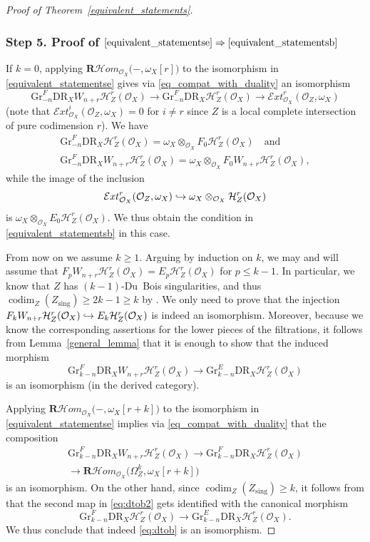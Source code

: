 \documentclass[JEP,XML,SOM,Unicode]{cedram}
\newcommand\hto{\mathrel{\lhook\joinrel\to}}
\theoremstyle{plain}
\theoremstyle{definition}
\newcommand\R{{\mathbf R}}
\newcommand\cH{\mathcal{H}}
\newcommand\cO{\mathcal{O}}
\newcommand\cH{\mathcal{H}}
\newcommand\cO{\mathcal{O}}
\newcommand\gr{\mathrm{Gr}}
\newcommand\DR{\mathrm{DR}}
\newcommand\sing{\mathrm{sing}}
\DeclareMathOperator{\codim}{codim}
\begin{document}
\begin{proof}[Proof of Theorem~\ref{equivalent_statements}]
\subsubsection*{Step 5. Proof of $\eqref{equivalent_statementse}\Rightarrow\eqref{equivalent_statementsb}$}
If $k=0$, applying $\R\cH om_{\cO_X}\big(-,\omega_X[r]\big)$ to the isomorphism in \eqref{equivalent_statementse} gives via \eqref{eq_compat_with_duality} an isomorphism\vspace*{-3pt}
\[\gr^F_{-n}\DR_XW_{n+r}\cH^r_Z(\cO_X)\to \gr^F_{-n}\DR_X\cH^r_Z(\cO_X)\to {\mathcal Ext}^r_{\cO_X}(\cO_Z,\omega_X)\]
(note that ${\mathcal Ext}^i_{\cO_X}(\cO_Z,\omega_X)=0$ for $i\neq r$ since $Z$ is a local complete intersection of pure codimension $r$).
We have
\begin{gather*}
\gr^F_{-n}\DR_X\cH^r_Z(\cO_X)=\omega_X\otimes_{\cO_X}F_0\cH^r_Z(\cO_X)\quad\text{and}\\
\gr^F_{-n}\DR_XW_{n+r}\cH^r_Z(\cO_X)=\omega_X\otimes_{\cO_X}F_0W_{n+r}\cH^r_Z(\cO_X),
\end{gather*}
while the image of the inclusion
\[
{\mathcal Ext}^r_{\cO_X}(\cO_Z,\omega_X)\hto \omega_X\otimes_{\cO_X}\cH^r_Z(\cO_X)
\]
is
$\omega_X\otimes_{\cO_X}E_0\cH^r_Z(\cO_X)$. We thus obtain the condition in \eqref{equivalent_statementsb} in this case.

From now on we assume $k\geq 1$. Arguing by induction on $k$, we may and will assume that
$F_pW_{n+r}\cH^r_Z(\cO_X)=E_p\cH^r_Z(\cO_X)$ for $p\leq k-1$. In particular, we know that $Z$ has $(k-1)$-Du~Bois singularities, and thus
$\codim_Z(Z_\sing)\geq 2k-1\geq k$ by \cite[Cor.\,3.40]{MP1}.
We only need to prove that the injection $F_{k}W_{n+r}\cH^r_Z(\cO_X) \hto E_{k}\cH^r_Z(\cO_X)$ is indeed an isomorphism.
Moreover, because we know the corresponding assertions for the lower pieces of the filtrations, it follows from Lemma~\ref{general_lemma}
that it is enough to show that the induced morphism
\begin{equation}\label{eq:dtob}
\gr^F_{k-n} \DR_X W_{n+r}\cH^r_Z(\cO_X)\to \gr^E_{k-n} \DR_X \cH^r_Z(\cO_X)
\end{equation}
is an isomorphism (in the derived category).

Applying $\R\cH om_{\cO_X}\big(-,\omega_X[r+k]\big)$ to the isomorphism in \eqref{equivalent_statementse} implies via \eqref{eq_compat_with_duality} that the composition
\begin{multline}\label{eq:dtob2}
\gr^F_{k-n}\DR_XW_{n+r}\cH^r_Z(\cO_X)\to \gr^F_{k-n}\DR_X\cH^r_Z(\cO_X)\\
\to \R\cH om_{\cO_X}(\Omega_Z^k,\omega_X[r+k]\big)
\end{multline}
is an isomorphism. On the other hand, since $\codim_Z(Z_\sing)\geq k$, it follows from
\cite[\S 5.2]{MP1}
that the second map in \eqref{eq:dtob2} gets identified with the canonical morphism
\[\gr^F_{k-n}\DR_X\cH^r_Z(\cO_X)\to \gr^E_{k-n}\DR_X\cH^r_Z(\cO_X).\]
We thus conclude that indeed \eqref{eq:dtob} is an isomorphism.


\end{proof}
\end{document}
